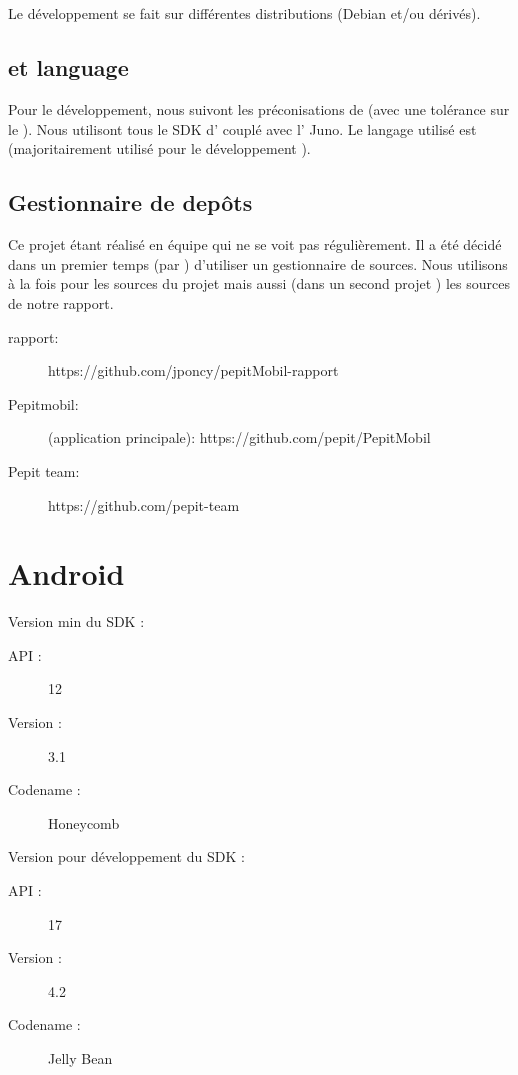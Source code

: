 \subsection{\os{}}
Le développement se fait sur différentes distributions \linux{} (Debian et/ou dérivés).
\subsection{\ide{} et language}
Pour le développement, nous suivont les préconisations de \google{} (avec une tolérance sur le \os{}). Nous utilisont tous le SDK d'\android{} couplé avec l'\ide{} \eclipse{} Juno. Le langage utilisé est \java{} (majoritairement utilisé pour le développement \android{}).
\subsection{Gestionnaire de depôts}
Ce projet étant réalisé en équipe qui ne se voit pas régulièrement. Il a été décidé dans un premier temps (par \responsableProjet{}) d'utiliser un gestionnaire de sources. Nous utilisons \github{} à la fois pour les sources du projet mais aussi (dans un second projet \github{}) les sources de notre rapport.
\begin{description}
    \item[rapport:] https://github.com/jponcy/pepitMobil-rapport
    \item[Pepitmobil:] (application principale): https://github.com/pepit/PepitMobil
    \item[Pepit team:] https://github.com/pepit-team
\end{description}
\section{Android}
Version min du SDK :
\begin{description}
\item[API : ] 12
\item[Version : ] 3.1 
\item[Codename : ] Honeycomb 
\end{description}

Version pour développement du SDK :
\begin{description}
\item[API : ] 17
\item[Version : ] 4.2 
\item[Codename : ] Jelly Bean
\end{description}

